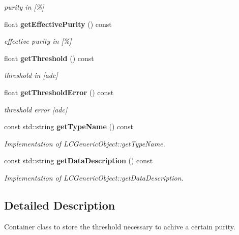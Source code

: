 \begin{DoxyCompactItemize}
\begin{DoxyCompactList}\small\item\em purity in [\%] \end{DoxyCompactList}\item 
float {\bf get\-Effective\-Purity} () const \label{classCALICE_1_1VetoThreshold_a379e4dffb8315d795c4b32935565afb9}

\begin{DoxyCompactList}\small\item\em effective purity in [\%] \end{DoxyCompactList}\item 
float {\bf get\-Threshold} () const \label{classCALICE_1_1VetoThreshold_a2dc83dbcf8b8f9cf35773876e1d3f44d}

\begin{DoxyCompactList}\small\item\em threshold in [adc] \end{DoxyCompactList}\item 
float {\bf get\-Threshold\-Error} () const \label{classCALICE_1_1VetoThreshold_aab2390cd17bd58fd9817f28f7c4c7546}

\begin{DoxyCompactList}\small\item\em threshold error [adc] \end{DoxyCompactList}\item 
const std\-::string {\bf get\-Type\-Name} () const \label{classCALICE_1_1VetoThreshold_a9b4556a5735ef0b698000511f19a79d5}

\begin{DoxyCompactList}\small\item\em Implementation of L\-C\-Generic\-Object\-::get\-Type\-Name. \end{DoxyCompactList}\item 
const std\-::string {\bf get\-Data\-Description} () const \label{classCALICE_1_1VetoThreshold_aae0d1f793fa674889e63fd43ba62e5df}

\begin{DoxyCompactList}\small\item\em Implementation of L\-C\-Generic\-Object\-::get\-Data\-Description. \end{DoxyCompactList}\end{DoxyCompactItemize}


\subsection{Detailed Description}
Container class to store the threshold necessary to achive a certain purity. 

